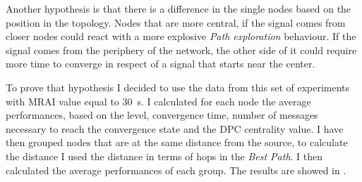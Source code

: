 Another hypothesis is that there is a difference in the single nodes based
on the position in the topology.
Nodes that are more central, if the signal comes from closer nodes could
react with a more explosive \textit{Path exploration} behaviour.
If the signal comes from the periphery of the network, the other side of
it could require more time to converge in respect of a signal that starts
near the center.

To prove that hypothesis I decided to use the data from this set of experiments
with \ac{MRAI} value equal to \SI{30}{\second}.
I calculated for each node the average performances, based on the level, convergence
time, number of messages necessary to reach the convergence state and the \ac{DPC}
centrality value.
I have then grouped nodes that are at the same distance from the source, to
calculate the distance I used the distance in terms of hops in the \textit{Best
Path}.
I then calculated the average performances of each group.
The results are showed in .

